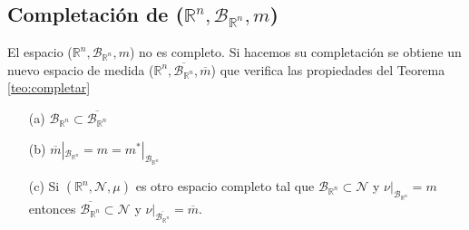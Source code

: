 \subsection{Completación de ($\mathbb{R}^n, \mathcal{B}_{\mathbb{R}^n}, m$)}
El espacio ($\mathbb{R}^n, \mathcal{B}_{\mathbb{R}^n}, m$) no es completo. Si hacemos su completación se obtiene un nuevo espacio de medida ($\mathbb{R}^n, \overline{\mathcal{B}_{\mathbb{R}^n}}, \overline{m}$) que verifica las propiedades del Teorema \ref{teo:completar}
\begin{enumerate}
    \item[(a)] $\mathcal{B}_{\mathbb{R}^n} \subset \overline{\mathcal{B}_{\mathbb{R}^n}}$
    \item[(b)] $\overline{m}|_{\mathcal{B}_{\mathbb{R}^n}} = m = m^*|_{\mathcal{B}_{\mathbb{R}^n}}$
    \item[(c)] Si $(\mathbb{R}^n, \mathcal{N}, \mu)$ es otro espacio completo tal que $\mathcal{B}_{\mathbb{R}^n} \subset \mathcal{N}$ y $\nu |_{\mathcal{B}_{\mathbb{R}^n}} = m$ entonces $\overline{\mathcal{B}_{\mathbb{R}^n}} \subset \mathcal{N}$ y $\nu |_{\overline{\mathcal{B}_{\mathbb{R}^n}}} = \overline{m}$.


\end{enumerate}
